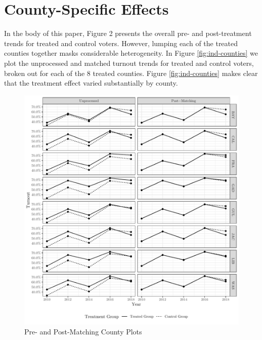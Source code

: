 \documentclass[
  12pt,
]{article}
\begin{document}
\hypertarget{county-specific-effects}{%
\section*{County-Specific Effects}\label{county-specific-effects}}

In the body of this paper, Figure 2 presents the overall pre- and post-treatment trends for treated and control voters. However, lumping each of the treated counties together masks considerable heterogeneity. In Figure \ref{fig:ind-counties} we plot the unprocessed and matched turnout trends for treated and control voters, broken out for each of the 8 treated counties. Figure \ref{fig:ind-counties} makes clear that the treatment effect varied substantially by county.

\begin{figure}[H]

{\centering \includegraphics{si_files/figure-latex/indcs-chunk-1} 

}

\caption{\label{fig:ind-counties}Pre- and Post-Matching County Plots}\label{fig:indcs-chunk}
\end{figure}
\end{document}
